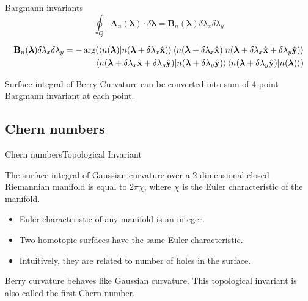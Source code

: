 \documentclass{beamer}
\begin{document}
\begin{frame}{Bargmann invariants}
\begin{equation*}
\oint_{Q}{\mathbf{A}_{n}(\bm{\lambda})\cdot \delta\bm{\lambda}} = \mathbf{B}_{n}(\bm{\lambda}) \delta\lambda_x\delta\lambda_y 
\end{equation*}
\begin{theorem}
\footnotesize
\begin{equation*}
\begin{split}
 \mathbf{B}_{n}(\bm{\lambda}) \delta\lambda_x\delta\lambda_y = -\arg(\braket{n(\bm{\lambda})|n(\bm{\lambda} + \delta\lambda_x \hat{\mathbf{x}})}\braket{n(\bm{\lambda} + \delta\lambda_x \hat{\mathbf{x}})|n(\bm{\lambda} + \delta\lambda_x \hat{\mathbf{x}} + \delta\lambda_y \hat{\mathbf{y}})}\\ \braket{n(\bm{\lambda} + \delta\lambda_x \hat{\mathbf{x}} + \delta\lambda_y \hat{\mathbf{y}})|n(\bm{\lambda} + \delta\lambda_y \hat{\mathbf{y}})}\braket{n(\bm{\lambda} + \delta\lambda_y \hat{\mathbf{y}})|n(\bm{\lambda})})
\end{split}
\end{equation*}
\end{theorem}
\normalsize
Surface integral of Berry Curvature can be converted into sum of 4-point Bargmann invariant at each point.
\end{frame}
\subsection{Chern numbers}
\begin{frame}{Chern numbers}{Topological Invariant}
\begin{theorem}
The surface integral of Gaussian curvature over a 2-dimensional closed Riemannian manifold is equal to $2\pi\chi$, where $\chi$ is the Euler characteristic of the manifold.
\end{theorem}
\begin{itemize}
 \item Euler characteristic of any manifold is an integer.
 \item Two homotopic surfaces have the same Euler characteristic.
 \item Intuitively, they are related to number of holes in the surface.
\end{itemize}

\alert{Berry curvature behaves like Gaussian curvature}. This topological invariant is also called the \alert{first Chern number}.
\end{frame}
\end{document}
